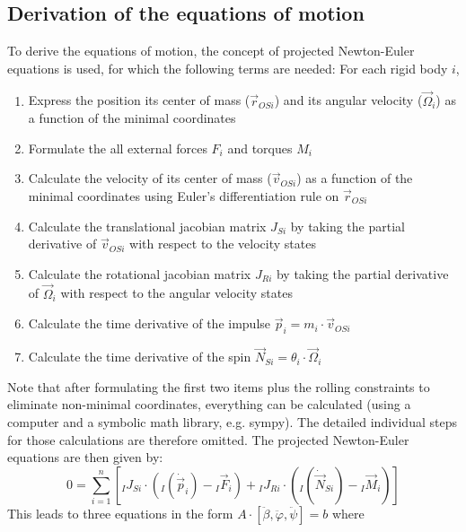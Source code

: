 \documentclass{article}
\begin{document}
\subsection{Derivation of the equations of motion}
To derive the equations of motion, the concept of projected Newton-Euler equations is used, for which the following terms are needed:
For each rigid body $i$, 
\begin{enumerate}
	\item Express the position its center of mass ($\vec{r}_{OSi}$) and its angular velocity ($\vec{\Omega}_i$) as a function of the minimal coordinates
	\item Formulate the all external forces $F_i$ and torques $M_i$
	\item Calculate the velocity of its center of mass ($\vec{v}_{OSi}$) as a function of the minimal coordinates using Euler's differentiation rule on $\vec{r}_{OSi}$
	\item Calculate the translational jacobian matrix $J_{Si}$ by taking the partial derivative of $\vec{v}_{OSi}$ with respect to the velocity states
	\item Calculate the rotational jacobian matrix $J_{Ri}$ by taking the partial derivative of $\vec{\Omega}_i$ with respect to the angular velocity states
	\item Calculate the time derivative of the impulse $\vec{p}_{i} = m_i \cdot \vec{v}_{OSi}$
	\item Calculate the time derivative of the spin $\vec{N}_{Si} = \theta_i \cdot \vec{\Omega}_{i}$
\end{enumerate}
Note that after formulating the first two items plus the rolling constraints to eliminate non-minimal coordinates, everything can be calculated (using a computer and a symbolic math library, e.g. sympy). The detailed individual steps for those calculations are therefore omitted.
The projected Newton-Euler equations are then given by:
\begin{equation}
0 = \sum_{i=1}^n \left[{}_I J_{Si} \cdot \left( {}_I \left(\dot{\vec{p}}_i \right) - {}_I \vec{F}_i \right) + {}_I J_{Ri} \cdot \left( {}_I \left(\dot{\vec{N}}_{Si} \right) - {}_I \vec{M}_i \right) \right]
\end{equation}
This leads to three equations in the form $A \cdot [\ddot{\beta}, \ddot{\varphi}, \ddot{\psi}] = b$ where
\end{document}
